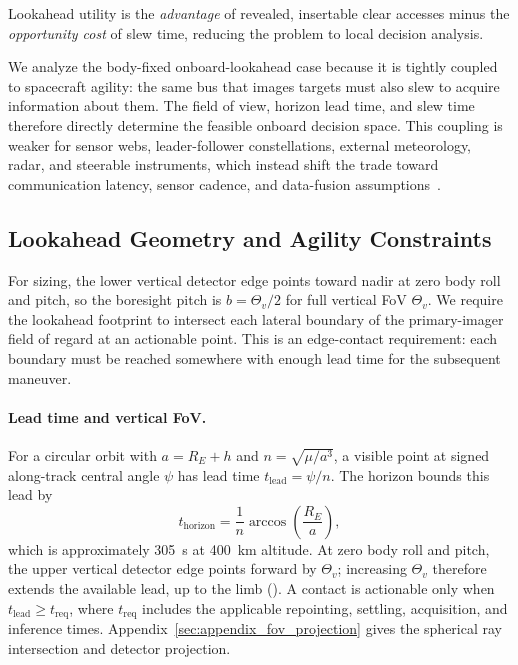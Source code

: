 Lookahead utility is the \emph{advantage} of revealed, insertable clear accesses minus the \emph{opportunity cost} of slew time, reducing the problem to local decision analysis.

We analyze the body-fixed onboard-lookahead case because it is tightly coupled to spacecraft agility: the same bus that images targets must also slew to acquire information about them.
The field of view, horizon lead time, and slew time therefore directly determine the feasible onboard decision space.
This coupling is weaker for sensor webs, leader-follower constellations, external meteorology, radar, and steerable instruments, which instead shift the trade toward communication latency, sensor cadence, and data-fusion assumptions~\citep{chien_autonomous_2005, chien_automated_2020, chien_using_2019, kacker_leveraging_2025, mahonchak_goes-r_nodate}.


\subsection{Lookahead Geometry and Agility Constraints}
\label{sec:lookahead_design}

For sizing, the lower vertical detector edge points toward nadir at zero body roll and pitch, so the boresight pitch is $b=\Theta_v/2$ for full vertical FoV $\Theta_v$.
We require the lookahead footprint to intersect each lateral boundary of the primary-imager field of regard at an actionable point. This is an edge-contact requirement: each boundary must be reached somewhere with enough lead time for the subsequent maneuver.

\paragraph{Lead time and vertical FoV.}
For a circular orbit with $a=R_E+h$ and $n=\sqrt{\mu/a^3}$, a visible point at signed along-track central angle $\psi$ has lead time $t_{\mathrm{lead}}=\psi/n$. The horizon bounds this lead by
\begin{equation}
t_{\mathrm{horizon}} = \frac{1}{n} \arccos\!\left(\frac{R_E}{a}\right),
\label{eq:horizon}
\end{equation}
which is approximately \SI{305}{\second} at \SI{400}{\kilo\metre} altitude. At zero body roll and pitch, the upper vertical detector edge points forward by $\Theta_v$; increasing $\Theta_v$ therefore extends the available lead, up to the limb (). A contact is actionable only when $t_{\mathrm{lead}}\geq t_{\mathrm{req}}$, where $t_{\mathrm{req}}$ includes the applicable repointing, settling, acquisition, and inference times. Appendix~\ref{sec:appendix_fov_projection} gives the spherical ray intersection and detector projection.

